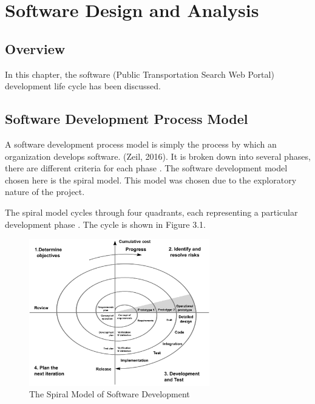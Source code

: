 
\chapter{Software Design and Analysis} %



\ifpdf
    \graphicspath{{3/figures/PNG/}{3/figures/PDF/}{3/figures/}}
\else
    \graphicspath{{3/figures/EPS/}{3/figures/}}
\fi

\section{Overview}
In this chapter, the software (Public Transportation Search Web Portal) development life cycle has been discussed.

\section{Software Development Process Model}
A software development process model is simply the process by which an organization 
develops software. (Zeil, 2016). It is broken down into several phases, there are different criteria for each phase \citep{marciniak1994encyclopedia}. The software development model chosen here is the spiral model. This model was chosen due to the exploratory nature of the project.

The spiral model cycles through four quadrants, each representing a particular development phase \cite{boehm_spiral_1988}. The cycle is shown in Figure 3.1.

\begin{figure}[th!]
	\centering
	\includegraphics[width=0.7\textwidth]{spiral}
	\caption[The Spiral Model of Software Development]{The Spiral Model of Software Development}
	\label{fig:spiral}
\end{figure}

